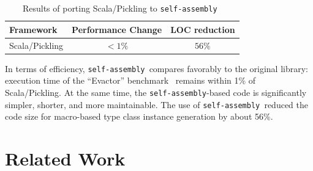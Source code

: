 \documentclass[preprint,nocopyrightspace]{sigplanconf}
\newcommand{\selfassembly}{\texttt{self-assembly~}}
\newcommand{\sselfassembly}{\texttt{self-assembly}}
\begin{document}
\begin{table}[h!]
\centering
\begin{tabular}{l c c }
\toprule %
\textbf{Framework} & \textbf{Performance Change} & \textbf{LOC reduction} \\ %
\midrule %
Scala/Pickling & $<1\%$ & $56\%$  \\
\bottomrule %
\end{tabular}
\caption{Results of porting Scala/Pickling to \selfassembly} %
\label{tab:results} %
\end{table}

In terms of efficiency, \selfassembly compares favorably to the original
library: execution time of the ``Evactor'' benchmark~\cite{Pickling} remains
within 1\% of Scala/Pickling. At the same time,
the \sselfassembly-based code is significantly simpler, shorter, and more
maintainable. The use of \selfassembly reduced the code size for macro-based
type class instance generation by about 56\%.



\section{Related Work}
\label{sec:related-work}


\end{document}
